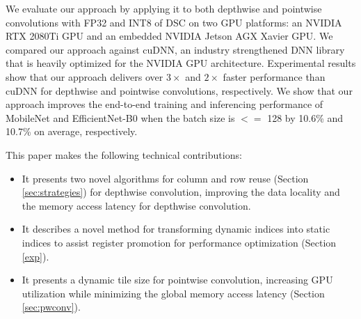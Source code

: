 We evaluate our approach by applying it to both depthwise and pointwise convolutions with FP32 and INT8 of DSC on two GPU platforms: an NVIDIA RTX 2080Ti GPU
and an embedded NVIDIA Jetson AGX Xavier GPU. We compared our approach against cuDNN, an industry strengthened DNN library that is heavily
optimized for the NVIDIA GPU architecture. Experimental results show that our approach delivers over $3\times$ and $2\times$ faster
performance than cuDNN for depthwise and pointwise convolutions, respectively. We show that our approach improves the end-to-end training and inferencing performance of MobileNet \cite{Sandler_2018_CVPR,howard2019searching} and EfficientNet-B0 \cite{tan2019efficientnet} when the batch size is $<=$ 128 by 10.6\% and 10.7\% on average, respectively.



This paper makes the following technical contributions:
\begin{itemize}
    \item It presents two novel algorithms for column and row reuse (Section \ref{sec:strategies}) for depthwise
        convolution, improving the data locality and the memory access latency for depthwise convolution.
    \item It describes a novel method for transforming dynamic indices into static indices to assist register promotion for performance
        optimization (Section \ref{exp}).
    \item It presents a dynamic tile size for pointwise convolution, increasing GPU utilization while minimizing the global memory
        access latency (Section \ref{sec:pwconv}).
\end{itemize}

